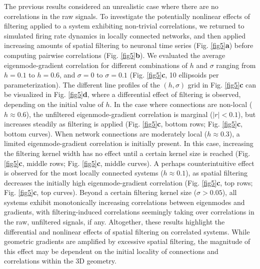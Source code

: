 \documentclass{article}
\begin{document}
The previous results considered an unrealistic case where there are no correlations in the raw signals. To investigate the potentially nonlinear effects of filtering applied to a system exhibiting non-trivial correlations, we returned to simulated firing rate dynamics in locally connected networks, and then applied increasing amounts of spatial filtering to neuronal time series (Fig. \ref{fig5}\textbf{a}) before computing pairwise correlations (Fig. \ref{fig5}\textbf{b}). We evaluated the average eigenmode-gradient correlation for different combinations of $h$ and $\sigma$ ranging from $h=0.1$ to $h=0.6$, and $\sigma=0$ to $\sigma=0.1$ (Fig. \ref{fig5}\textbf{c}, 10 ellipsoids per parameterization). The different line profiles of the $(h, \sigma)$ grid in Fig. \ref{fig5}\textbf{c} can be visualized in Fig. \ref{fig5}\textbf{d}, where a differential effect of filtering is observed, depending on the initial value of $h$. In the case where connections are non-local ($h\approx0.6$), the unfiltered eigenmode-gradient correlation is marginal ($|r|<0.1$), but increases steadily as filtering is applied (Fig. \ref{fig5}\textbf{c}, bottom rows; Fig. \ref{fig5}\textbf{c}, bottom curves). When network connections are moderately local ($h\approx0.3$), a limited eigenmode-gradient correlation is initially present. In this case, increasing the filtering kernel width has no effect until a certain kernel size is reached (Fig. \ref{fig5}\textbf{c}, middle rows; Fig. \ref{fig5}\textbf{c}, middle curves). A perhaps counterintuitive effect is observed for the most locally connected systems ($h\approx0.1$), as spatial filtering decreases the initially high eigenmode-gradient correlation (Fig. \ref{fig5}\textbf{c}, top rows; Fig. \ref{fig5}\textbf{c}, top curves). Beyond a certain filtering kernel size ($\sigma>0.05$), all systems exhibit monotonically increasing correlations between eigenmodes and gradients, with filtering-induced correlations seemingly taking over correlations in the raw, unfiltered signals, if any. Altogether, these results highlight the differential and nonlinear effects of spatial filtering on correlated systems. While geometric gradients are amplified by excessive spatial filtering, the magnitude of this effect may be dependent on the initial locality of connections and correlations within the 3D geometry.
\end{document}
